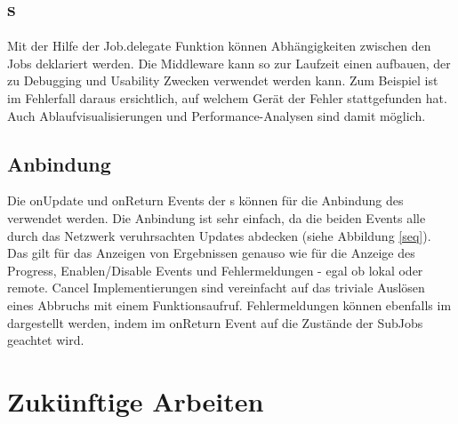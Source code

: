 \begin{multicols}{2}
\subsection{\JobTree s}
Mit der Hilfe der Job.delegate Funktion können Abhängigkeiten zwischen den Jobs deklariert werden.
Die Middleware kann so zur Laufzeit einen \JobTree{} aufbauen, der zu Debugging und Usability Zwecken verwendet werden kann.
Zum Beispiel ist im Fehlerfall daraus ersichtlich, auf welchem Gerät der Fehler stattgefunden hat.
Auch Ablaufvisualisierungen und Performance-Analysen sind damit möglich.

\subsection{\UI{} Anbindung}
Die onUpdate und onReturn Events der \RootJob s können für die Anbindung des \UI{} verwendet werden.
Die Anbindung ist sehr einfach, da die beiden Events alle durch das Netzwerk veruhrsachten \UI{} Updates abdecken (siehe Abbildung \ref{seq}).
Das gilt für das Anzeigen von Ergebnissen genauso wie für die Anzeige des Progress, Enablen/Disable Events und Fehlermeldungen - egal ob lokal oder remote.
Cancel Implementierungen sind vereinfacht auf das triviale Auslösen eines Abbruchs mit einem Funktionsaufruf.
Fehlermeldungen können ebenfalls im \UI{} dargestellt werden, indem im onReturn Event auf die Zustände der SubJobs geachtet wird.
\end{multicols}




\clearpage
\section{Zukünftige Arbeiten}

